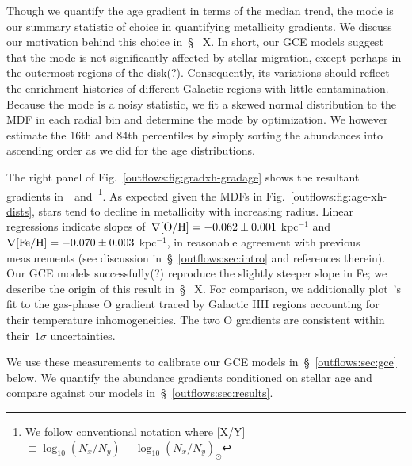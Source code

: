 Though we quantify the age gradient in terms of the median trend, the mode is
our summary statistic of choice in quantifying metallicity gradients.
We discuss our motivation behind this choice in~\S~{\color{red} X}.
In short, our GCE models suggest that the mode is not significantly affected
by stellar migration, {\color{red} except perhaps in the outermost regions of
the disk(?).}
Consequently, its variations should reflect the enrichment histories of
different Galactic regions with little contamination.
Because the mode is a noisy statistic, we fit a skewed normal distribution to
the MDF in each radial bin and determine the mode by optimization.
We however estimate the 16th and 84th percentiles by simply sorting the
abundances into ascending order as we did for the age distributions.
\par
The right panel of Fig.~\ref{outflows:fig:gradxh-gradage} shows the resultant
gradients in~\oh~and~\feh\footnote{
	We follow conventional notation where
	[X/Y]~$\equiv \log_{10} (N_x / N_y) - \log_{10} (N_x / N_y)_\odot$
}.
As expected given the MDFs in Fig.~\ref{outflows:fig:age-xh-dists}, stars tend
to decline in metallicity with increasing radius.
Linear regressions indicate slopes of~$\nabla\text{[O/H]} = -0.062 \pm 0.001$ kpc$^{-1}$
and~$\nabla\text{[Fe/H]} = -0.070 \pm 0.003$ kpc$^{-1}$, in reasonable agreement with
previous measurements (see discussion in~\S~\ref{outflows:sec:intro} and
references therein).
Our GCE models {\color{red} successfully(?)} reproduce the slightly steeper
slope in Fe; we describe the origin of this result in~\S~{\color{red} X}.
For comparison, we additionally plot~\citeauthor{MendezDelgado2022}'s
\citeyearpar{MendezDelgado2022} fit to the gas-phase O gradient traced by
Galactic HII regions accounting for their temperature inhomogeneities.
The two O gradients are consistent within their~$1\sigma$ uncertainties.
\par
We use these measurements to calibrate our GCE models
in~\S~\ref{outflows:sec:gce} below.
We quantify the abundance gradients conditioned on stellar age and compare
against our models in~\S~\ref{outflows:sec:results}.

